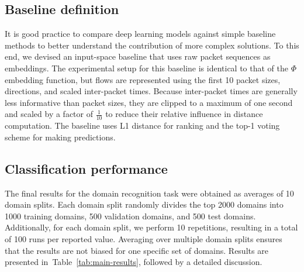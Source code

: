 \documentclass[lettersize,journal,twoside,article]{IEEEtran}
\newcommand{\tabref}[1]{Table~\ref{#1}}
\begin{document}
\subsection{Baseline definition}
\label{sec:input-space-baseline}
It is good practice to compare deep learning models against simple baseline methods to better understand the contribution of more complex solutions. To this end, we devised an input-space baseline that uses raw packet sequences as embeddings. The experimental setup for this baseline is identical to that of the $\Phi$ embedding function, but flows are represented using the first 10 packet sizes, directions, and scaled inter-packet times. Because inter-packet times are generally less informative than packet sizes, they are clipped to a maximum of one second and scaled by a factor of $\frac{1}{10}$ to reduce their relative influence in distance computation. The baseline uses L1 distance for ranking and the top-1 voting scheme for making predictions.

\subsection{Classification performance}
The final results for the domain recognition task were obtained as averages of 10 domain splits. Each domain split randomly divides the top 2000 domains into 1000 training domains, 500 validation domains, and 500 test domains. Additionally, for each domain split, we perform 10 repetitions, resulting in a total of 100 runs per reported value. Averaging over multiple domain splits ensures that the results are not biased for one specific set of domains. Results are presented in~\tabref{tab:main-results}, followed by a detailed discussion.
\end{document}
